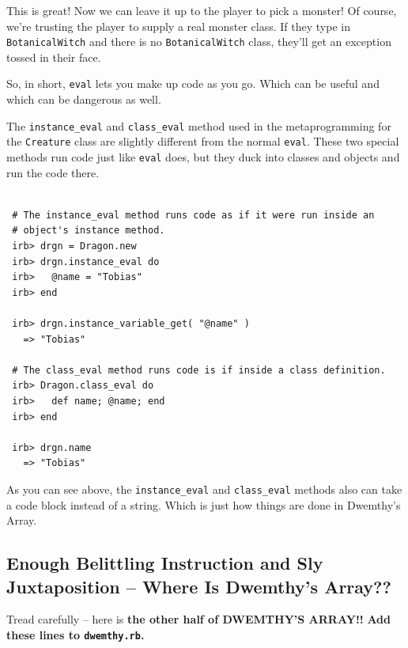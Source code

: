 \documentclass[10pt,twoside]{report}
\begin{document}
This is great!  Now we can leave it up to the player to pick a
monster!  Of course, we're trusting the player to supply a real
monster class.  If they type in
\lstinline[breaklines=true]|BotanicalWitch| and there is no
\lstinline[breaklines=true]|BotanicalWitch| class, they'll get an
exception tossed in their face.

So, in short, \lstinline[breaklines=true]|eval| lets you make up code
as you go.  Which can be useful and which can be dangerous as well.

The \lstinline[breaklines=true]|instance_eval| and
\lstinline[breaklines=true]|class_eval| method used in the
metaprogramming for the \lstinline[breaklines=true]|Creature| class
are slightly different from the normal
\lstinline[breaklines=true]|eval|.  These two special methods run code
just like \lstinline[breaklines=true]|eval| does, but they duck into
classes and objects and run the code there.


\begin{lstlisting}

 # The instance_eval method runs code as if it were run inside an
 # object's instance method.
 irb> drgn = Dragon.new
 irb> drgn.instance_eval do
 irb>   @name = "Tobias"
 irb> end

 irb> drgn.instance_variable_get( "@name" )
   => "Tobias"

 # The class_eval method runs code is if inside a class definition.
 irb> Dragon.class_eval do
 irb>   def name; @name; end
 irb> end

 irb> drgn.name
   => "Tobias"

\end{lstlisting}


As you can see above, the \lstinline[breaklines=true]|instance_eval|
and \lstinline[breaklines=true]|class_eval| methods also can take a
code block instead of a string.  Which is just how things are done in
Dwemthy's Array.



\subsection{Enough Belittling Instruction and Sly Juxtaposition -- Where Is Dwemthy's Array??}



Tread carefully -- here is {\bf the other half of DWEMTHY'S ARRAY!!}
{\bf Add these lines to \lstinline[breaklines=true]|dwemthy.rb|.}
\end{document}
